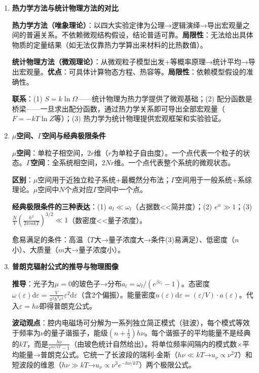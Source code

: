 \documentclass[12pt,a4paper,fontset=mac]{ctexart}
\newcommand{\dd}{\mathrm{d}}
\newcommand{\đ}{\mathrm{đ}}
\begin{document}
\begin{enumerate}
\item \textbf{热力学方法与统计物理方法的对比}

\textbf{热力学方法（唯象理论）}：以四大实验定律为公理→逻辑演绎→导出宏观量之间的普遍关系。不依赖微观结构假设，结论普适可靠。\textbf{局限性}：无法给出具体物质的定量结果（如无法仅靠热力学算出来材料的比热数值）。

\textbf{统计物理方法（微观理论）}：从微观粒子模型出发+等概率原理→统计平均→导出宏观量。\textbf{优点}：可具体计算物态方程、热容等。\textbf{局限性}：依赖模型假设的准确性。

\textbf{联系}：(1) $S=k\ln\Omega$——统计物理为热力学提供了微观基础；(2) 配分函数是桥梁——一旦求出配分函数，通过热力学关系即可导出全部宏观量（$F=-kT\ln Z$等）；(3) 热力学为统计物理提供宏观框架和实验验证。

\item \textbf{$\mu$空间、$\Gamma$空间与经典极限条件}

\textbf{$\mu$空间}：单粒子相空间，$2r$维（$r$为单粒子自由度）。一个点代表一个粒子的状态。\textbf{$\Gamma$空间}：全系统相空间，$2Nr$维。一个点代表整个系统的微观状态。

\textbf{区别}：$\mu$空间用于近独立粒子系统+最概然分布法；$\Gamma$空间用于一般系统+系综理论。$\mu$空间中$N$个点对应$\Gamma$空间中一个点。

\textbf{经典极限条件的三种表达}：(1) $a_l\ll\omega_l$（占据数<<简并度）；(2) $e^\alpha\gg1$；(3) $\frac{N}{V}\left(\frac{h^2}{2\pi mkT}\right)^{3/2}\ll1$（数密度<<量子浓度）。

愈易满足的条件：高温（$T$大→量子浓度大→条件(3)易满足）、低密度（$n$小）、大质量（$m$大→量子浓度小）。

\item \textbf{普朗克辐射公式的推导与物理图像}

\textbf{推导}：光子为$\mu=0$的玻色子→分布$a_l=\omega_l/(e^{\beta\varepsilon_l}-1)$。态密度$\omega(\varepsilon)\dd\varepsilon=\frac{V}{\pi^2\hbar^3c^3}\varepsilon^2\dd\varepsilon$（含2个偏振）。能量密度$u(\varepsilon)\dd\varepsilon=(\varepsilon/V)\cdot a(\varepsilon)$。代入$\varepsilon=h\nu$即得普朗克公式。

\textbf{波动观点}：腔内电磁场可分解为一系列独立简正模式（驻波），每个模式等效于频率为$\nu$的量子谐振子，能级$(n+\frac12)h\nu$。每个谐振子的平均能量不是经典的$kT$，而是$\frac{h\nu}{e^{h\nu/kT}-1}$（由玻色统计自然给出）。将单位频率间隔内的模式数$\times$平均能量→普朗克公式。它统一了长波段的瑞利-金斯（$h\nu\ll kT$→$u_\nu\propto\nu^2T$）和短波段的维恩（$h\nu\gg kT$→$u_\nu\propto\nu^3e^{-h\nu/kT}$）两个极限公式。


\end{enumerate}
\end{document}
